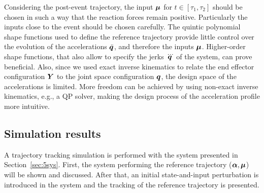 \documentclass[../DC2019003Bouma.tex]{subfiles}
\begin{document}
Considering the post-event trajectory, the input $\boldsymbol{\mu}$ for $t\in[\tau_1,\tau_2]$ should be chosen in such a way that the reaction forces remain positive. Particularly the inputs close to the event should be chosen carefully. The quintic polynomial shape functions used to define the reference trajectory provide little control over the evolution of the accelerations $\ddot{{\boldsymbol{q}}}$, and therefore the inputs $\boldsymbol{\mu}$. Higher-order shape functions, that also allow to specify the jerks $\dddot{{\boldsymbol{q}}}$ of the system, can prove beneficial. Also, since we used exact inverse kinematics to relate the end effector configuration ${\boldsymbol{Y}}$ to the joint space configuration ${\boldsymbol{q}}$, the design space of the accelerations is limited. More freedom can be achieved by using non-exact inverse kinematics, e.g., a QP solver, making the design process of the acceleration profile more intuitive.

\subsection{Simulation results}
A trajectory tracking simulation is performed with the system presented in Section~\ref{sec:5sys}. First, the system performing the reference trajectory ($\boldsymbol{\alpha},\boldsymbol{\mu}$) will be shown and discussed. After that, an initial state-and-input perturbation is introduced in the system and the tracking of the reference trajectory is presented.
\end{document}
